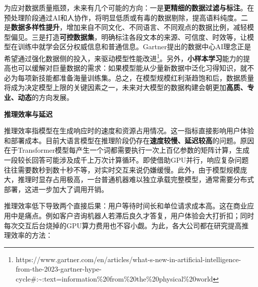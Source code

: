 \documentclass[
  letterpaper,
]{scrbook}
\begin{document}
为应对数据质量瓶颈，未来有几个可能的方向：一是\textbf{更精细的数据过滤与标注}。在预处理阶段通过AI和人协作，将明显低质或有毒的数据剔除，提高语料纯度。二是\textbf{数据多样性提升}，增加来自不同文化、不同语言、不同观点的数据比例，减轻模型偏见。三是打造\textbf{可控数据集}，明确标注各段文本的来源、可信度、时效等，让模型在训练中就学会区分权威信息和普通信息。Gartner提出的数据中心AI理念正是希望通过强化数据侧的投入，来驱动模型性能改进\footnote{https://www.gartner.com/en/articles/what-s-new-in-artificial-intelligence-from-the-2023-gartner-hype-cycle\#:\textasciitilde:text=information\%20from\%20the\%20physical\%20world}。另外，\textbf{小样本学习}能力的提高也可以缓解对巨量数据的需求：如果模型能从少量新数据中泛化习得知识，就不必为每项新技能都准备海量训练集。总之，在模型规模红利渐趋饱和后，数据质量将成为决定模型上限的关键因素之一，未来对大模型的数据构建会朝更加\textbf{高质、专业、动态}的方向发展。

\textbf{推理效率与延迟}

推理效率指模型在生成响应时的速度和资源占用情况。这一指标直接影响用户体验和部署成本。目前大语言模型在推理阶段仍存在\textbf{速度较慢、延迟较高}的问题。原因在于Transformer模型每产生一个词都需要执行一次上百亿参数的矩阵计算，生成一段较长回答可能涉及成千上万次计算循环。即使借助GPU并行，响应复杂问题往往需要数秒到数十秒不等，对实时交互来说仍嫌缓慢。此外，由于模型规模庞大，推理时显存占用极高，一台普通机器难以独立承载完整模型，通常需要分布式部署，这进一步加大了调用开销。

推理效率低下导致两个直接后果：用户等待时间长和单位请求成本高。这在商业应用中是痛点。例如客户咨询机器人若滞后良久才答复，用户体验会大打折扣；同时每次交互后台烧掉的GPU算力费用也不容小觑。为此，各大公司都在研究提高推理效率的方法：
\end{document}
